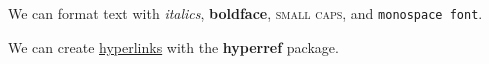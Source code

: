 \documentclass{article}
\begin{document}
We can format text with \textit{italics}, \textbf{boldface}, \textsc{small caps}, and \texttt{monospace font}.

\vspace{1cm}

We can create \href{http://www.google.com/}{hyperlinks} with the \textbf{hyperref} package.
\end{document}
